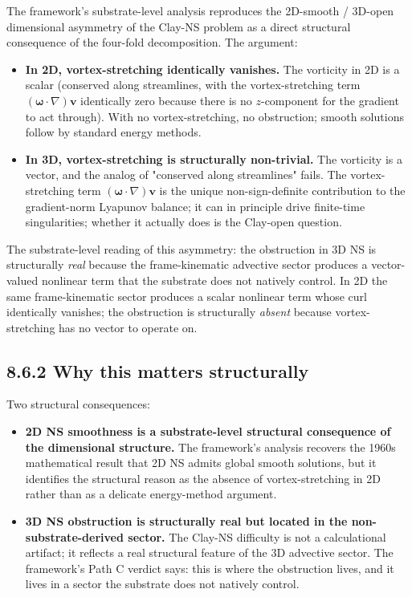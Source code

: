 \documentclass[11pt]{book}
\begin{document}
The framework's substrate-level analysis reproduces the 2D-smooth / 3D-open dimensional asymmetry of the Clay-NS problem as a direct structural consequence of the four-fold decomposition. The argument:

\begin{itemize}
\item \textbf{In 2D, vortex-stretching identically vanishes.} The vorticity in 2D is a scalar (conserved along streamlines, with the vortex-stretching term $(\boldsymbol\omega\cdot\nabla)\mathbf{v}$ identically zero because there is no $z$-component for the gradient to act through). With no vortex-stretching, no obstruction; smooth solutions follow by standard energy methods.
\item \textbf{In 3D, vortex-stretching is structurally non-trivial.} The vorticity is a vector, and the analog of "conserved along streamlines" fails. The vortex-stretching term $(\boldsymbol\omega\cdot\nabla)\mathbf{v}$ is the unique non-sign-definite contribution to the gradient-norm Lyapunov balance; it can in principle drive finite-time singularities; whether it actually does is the Clay-open question.
\end{itemize}

The substrate-level reading of this asymmetry: the obstruction in 3D NS is structurally \textit{real} because the frame-kinematic advective sector produces a vector-valued nonlinear term that the substrate does not natively control. In 2D the same frame-kinematic sector produces a scalar nonlinear term whose curl identically vanishes; the obstruction is structurally \textit{absent} because vortex-stretching has no vector to operate on.

\subsection{8.6.2 Why this matters structurally}

Two structural consequences:

\begin{itemize}
\item \textbf{2D NS smoothness is a substrate-level structural consequence of the dimensional structure.} The framework's analysis recovers the 1960s mathematical result that 2D NS admits global smooth solutions, but it identifies the structural reason as the absence of vortex-stretching in 2D rather than as a delicate energy-method argument.
\item \textbf{3D NS obstruction is structurally real but located in the non-substrate-derived sector.} The Clay-NS difficulty is not a calculational artifact; it reflects a real structural feature of the 3D advective sector. The framework's Path C verdict says: this is where the obstruction lives, and it lives in a sector the substrate does not natively control.
\end{itemize}
\end{document}
